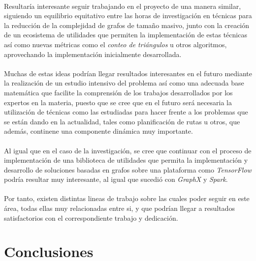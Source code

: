\documentclass{subfiles}
\begin{document}
      \paragraph{}
      Resultaría interesante seguir trabajando en el proyecto de una manera similar, siguiendo un equilibrio equitativo entre las horas de investigación en técnicas para la reducción de la complejidad de grafos de tamaño masivo, junto con la creación de un ecosistema de utilidades que permiten la implementación de estas técnicas así como nuevas métricas como el \emph{conteo de triángulos} u otros algoritmos, aprovechando la implementación inicialmente desarrollada.

      \paragraph{}
      Muchas de estas ideas podrían llegar resultados interesantes en el futuro mediante la realización de un estudio intensivo del problema así como una adecuada base matemática que facilite la comprensión de los trabajos desarrollados por los expertos en la materia, puesto que se cree que en el futuro será necesaria la utilización de técnicas como las estudiadas para hacer frente a los problemas que se están dando en la actualidad, tales como planificación de rutas u otros, que además, continene una componente dinámica muy importante.

      \paragraph{}
      Al igual que en el caso de la investigación, se cree que continuar con el proceso de implementación de una biblioteca de utilidades que permita la implementación y desarrollo de soluciones basadas en grafos sobre una plataforma como \emph{TensorFlow} podría resultar muy interesante, al igual que sucedió con \emph{GraphX} y \emph{Spark}.

      \paragraph{}
      Por tanto, existen distintas lineas de trabajo sobre las cuales poder seguir en este área, todas ellas muy relacionadas entre si, y que podrían llegar a resultados satisfactorios con el correspondiente trabajo y dedicación.

    \section{Conclusiones}
    \label{sec:implementation_conclusions}
\end{document}
